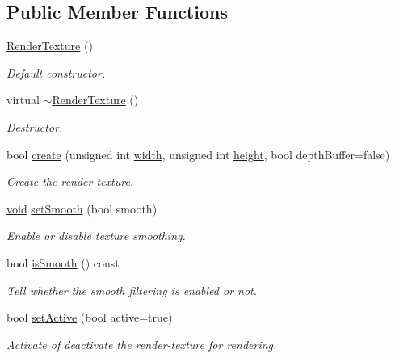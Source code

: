 \subsection*{Public Member Functions}
\begin{DoxyCompactItemize}
\item 
\hyperlink{classsf_1_1_render_texture_a19ee6e5b4c40ad251803389b3953a9c6}{Render\-Texture} ()
\begin{DoxyCompactList}\small\item\em Default constructor. \end{DoxyCompactList}\item 
virtual \hyperlink{classsf_1_1_render_texture_a94b84ab9335be84d2a014c964d973304}{$\sim$\-Render\-Texture} ()
\begin{DoxyCompactList}\small\item\em Destructor. \end{DoxyCompactList}\item 
bool \hyperlink{classsf_1_1_render_texture_aefbb76eb3b87e368ab974b2660931ccb}{create} (unsigned int \hyperlink{gl3_8h_a9d14ddc31c6c8b61f3fe3679ab976133}{width}, unsigned int \hyperlink{gl3_8h_a67001679ebf2bb0ba972db4d29c6550c}{height}, bool depth\-Buffer=false)
\begin{DoxyCompactList}\small\item\em Create the render-\/texture. \end{DoxyCompactList}\item 
\hyperlink{glutf90_8h_ac778d6f63f1aaf8ebda0ce6ac821b56e}{void} \hyperlink{classsf_1_1_render_texture_af08991e63c6020865dd07b20e27305b6}{set\-Smooth} (bool smooth)
\begin{DoxyCompactList}\small\item\em Enable or disable texture smoothing. \end{DoxyCompactList}\item 
bool \hyperlink{classsf_1_1_render_texture_ae385f4f4dbd2af50fb11947bf0bcb83d}{is\-Smooth} () const 
\begin{DoxyCompactList}\small\item\em Tell whether the smooth filtering is enabled or not. \end{DoxyCompactList}\item 
bool \hyperlink{classsf_1_1_render_texture_a5da95ecdbce615a80bb78399012508cf}{set\-Active} (bool active=true)
\begin{DoxyCompactList}\small\item\em Activate of deactivate the render-\/texture for rendering. \end{DoxyCompactList}\item 

\end{DoxyCompactItemize}
